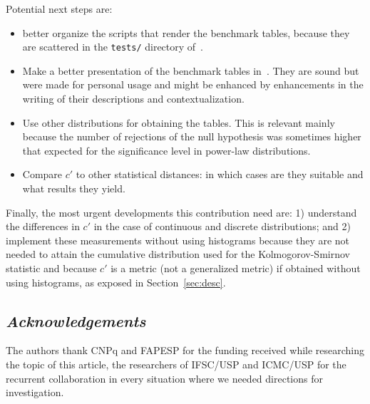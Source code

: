 \documentclass[12pt,fleqn]{article}
\begin{document}
Potential next steps are:
\begin{itemize}
	\item better organize the scripts that render the benchmark tables,
		because they are scattered in the \texttt{tests/} directory
		of~\cite{gmaneLegacy}.
	\item Make a better presentation of the benchmark tables in~\cite{ksstats}.
		They are sound but were made for personal usage and might be enhanced
		by enhancements in the writing of their descriptions and contextualization.
	\item Use other distributions for obtaining the tables.
		This is relevant mainly because the number of rejections of the null hypothesis
		was sometimes higher that expected for the significance level in power-law distributions.
	\item Compare $c'$ to other statistical distances: in which cases are they suitable and
		what results they yield.
\end{itemize}
\noindent Finally, the most urgent developments this contribution need are:
1) understand the differences in $c'$ in the case of continuous and discrete distributions;
and 2) implement these measurements without using histograms because they are not needed to
attain the cumulative distribution used for the Kolmogorov-Smirnov statistic and because
$c'$ is a metric (not a generalized metric) if obtained without using histograms,
as exposed in Section~\ref{sec:desc}.





\subsection*{\textit{Acknowledgements}}
The authors thank CNPq and FAPESP for the funding received while researching the topic of this article,
the researchers of IFSC/USP and ICMC/USP for the recurrent collaboration in every situation
where we needed directions for investigation.
\end{document}
